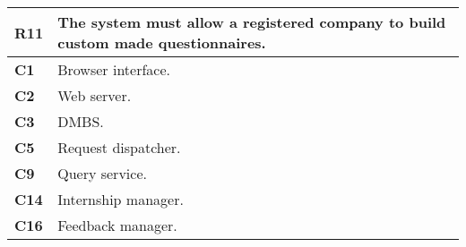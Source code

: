 \begin{table}[H]
    \centering
    \begin{tabular}{|l|m{10cm}|}
        \hline \textbf{R11} & The system must allow a registered company to build custom made questionnaires.\\
        \hline \textbf{C1} & Browser interface. \\
        \hline \textbf{C2} & Web server. \\
        \hline \textbf{C3} & DMBS. \\
        \hline \textbf{C5} & Request dispatcher. \\
        \hline \textbf{C9} & Query service. \\
        \hline \textbf{C14} & Internship manager. \\
        \hline \textbf{C16} & Feedback manager. \\
        \hline
    \end{tabular}
\end{table}

